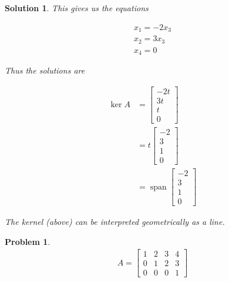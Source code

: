 \documentclass{article}
\newtheorem{problem}{Problem}
\newtheorem*{solution}{Solution}
\DeclareMathOperator{\Span}{span}
\begin{document}
\begin{solution}
This gives us the equations

\begin{align*}
x_{1} = -2x_{3} \\
x_{2} = 3x_{3} \\
x_{4} = 0
\end{align*}

Thus the solutions are

\begin{align*}
\ker A &= \begin{bmatrix}
-2t \\ 3t \\ t \\ 0
\end{bmatrix} \\
&= t \begin{bmatrix}
-2 \\ 3 \\ 1 \\ 0
\end{bmatrix} \\
&= \Span \begin{bmatrix}
-2 \\ 3 \\ 1 \\ 0
\end{bmatrix}
\end{align*}

The kernel (above) can be interpreted geometrically as a line.

\end{solution}

\begin{problem}
\begin{align*}
A = \begin{bmatrix}1 & 2 & 3 & 4 \\ 0 & 1 & 2 & 3 \\ 0 & 0 & 0 & 1 \end{bmatrix}
\end{align*}
\end{problem}
\end{document}

